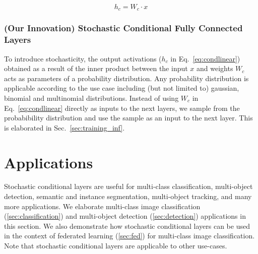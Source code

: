 \documentclass[12pt, letterpaper]{article}
\begin{document}
\begin{equation}
h_c=W_c \cdot x
    \label{eq:condlinear}
\end{equation}

\subsubsection{(Our Innovation) Stochastic Conditional Fully Connected Layers}
\label{sec:stochasticcondfc}
To introduce stochasticity, the output activations ($h_c$ in Eq.~\eqref{eq:condlinear}) obtained as a result of the inner product between the input $x$ and weights $W_c$ acts as parameters of a probability distribution. 
Any probability distribution is applicable according to the use case including (but not limited to) gaussian, binomial and multinomial distributions.  
Instead of using $W_{c}$ in Eq.~\eqref{eq:condlinear} directly as inputs to the next layers, we sample from the probabibility distribution and use the sample as an input to the next layer. This is elaborated in Sec.~\ref{sec:training_inf}.


\section{Applications}
\label{sec:app}
Stochastic conditional layers are useful for multi-class classification, multi-object detection, semantic and instance segmentation, multi-object tracking, and many more applications. We elaborate multi-class image classification (\ref{sec:classification}) and multi-object detection (\ref{sec:detection}) applications in this section. We also demonstrate how stochastic conditional layers can be used in the context of federated learning (\ref{sec:fed}) for multi-class image classification. Note that stochastic conditional layers are applicable to other use-cases.
\end{document}
